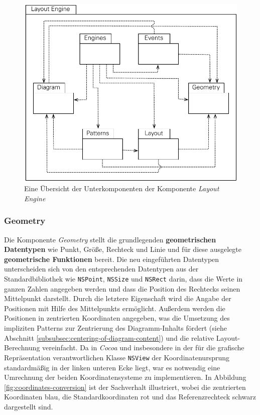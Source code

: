 \begin{figure}[hbt]
    \centering
    \includegraphics[scale=0.85]{resources/layout-engine-subcomponents}
    \caption{Eine Übersicht der Unterkomponenten der Komponente \textit{Layout Engine}}
    \label{fig:layout-engine-subcomponents}
\end{figure}

\subsubsection{Geometry}
\label{subsubsec:geometry}

Die Komponente \textit{Geometry} stellt die grundlegenden \textbf{geometrischen Datentypen} wie Punkt, Größe, Rechteck und Linie und für diese ausgelegte \textbf{geometrische Funktionen} bereit. Die neu eingeführten Datentypen unterscheiden sich von den entsprechenden Datentypen aus der Standardbibliothek wie \texttt{NSPoint}, \texttt{NSSize} und \texttt{NSRect} darin, dass die Werte in ganzen Zahlen angegeben werden und dass die Position des Rechtecks seinen Mittelpunkt darstellt. Durch die letztere Eigenschaft wird die Angabe der Positionen mit Hilfe des Mittelpunkts ermöglicht. Außerdem werden die Positionen in zentrierten Koordinaten angegeben, was die Umsetzung des impliziten Patterns zur Zentrierung des Diagramm-Inhalts fördert (siehe Abschnitt \ref{subsubsec:centering-of-diagram-content}) und die relative Layout-Berechnung vereinfacht. Da in \textit{Cocoa} und insbesondere in der für die grafische Repräsentation verantwortlichen Klasse \texttt{NSView} der Koordinatenursprung standardmäßig in der linken unteren Ecke liegt, war es notwendig eine Umrechnung der beiden Koordinatensysteme zu implementieren. In Abbildung \ref{fig:coordinates-conversion} ist der Sachverhalt illustriert, wobei die zentrierten Koordinaten blau, die Standardkoordinaten rot und das Referenzrechteck schwarz dargestellt sind.

